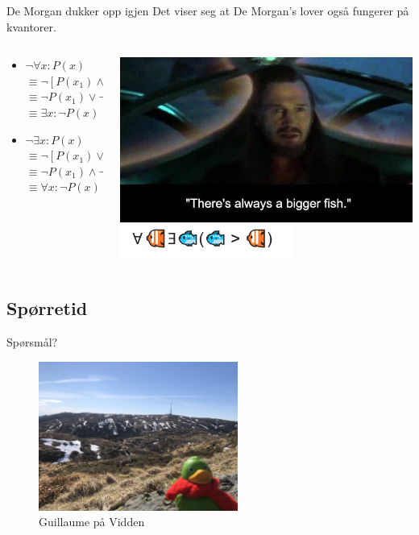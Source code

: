 \begin{frame}{De Morgan dukker opp igjen}
Det viser seg at De Morgan's lover også fungerer på kvantorer.\\
    \begin{columns}
    \begin{column}{0.48\textwidth}
    \begin{itemize}
        \item $\lnot \forall x : P(x)$ \\
        $\equiv \lnot [P(x_1) \land P(x_2) \land ... \land P(x_n)]$\\
        $\equiv \lnot P(x_1) \lor \lnot P(x_2) \lor ... \lor \lnot P(x_n)$\\ $\equiv \exists x : \lnot P(x)$
        \item $\lnot \exists x : P(x)$\\
        $\equiv \lnot [P(x_1) \lor P(x_2) \lor ... \lor .. P(x_n)]$\\
        $\equiv \lnot P(x_1) \land \lnot P(x_2) \land ... \land \lnot P(x_n)$\\ 
        $\equiv \forall x : \lnot P(x)$
    \end{itemize}      
    \end{column}
    \pause
    \begin{column}{0.45\textwidth}
        \includegraphics[scale=0.3]{images/Always a bigger fish.jpeg}
        \pause
        \includegraphics[scale=1]{images/bigger fish.PNG}
    \end{column}
    \end{columns}
\end{frame}

\subsection*{Spørretid}
\begin{frame}{Spørsmål?}
    \begin{figure}
        \centering
        \includegraphics[height = 4.9cm]{images/guillaume5.jpg}
        \caption{Guillaume på Vidden}
        \label{fig:guillaume5}
    \end{figure}
\end{frame}